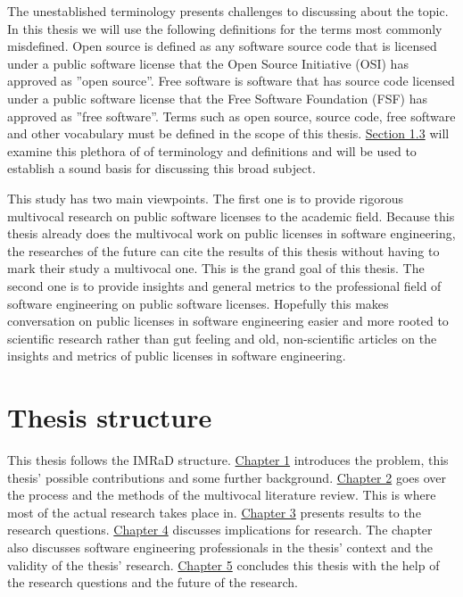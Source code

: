 The unestablished terminology presents challenges to discussing about the topic. In this thesis we will use the following definitions for the terms most commonly misdefined. Open source is defined as any software source code that is licensed under a public software license that the Open Source Initiative (OSI) has approved as ''open source''. Free software is software that has source code licensed under a public software license that the Free Software Foundation (FSF) has approved as ''free software''. 
Terms such as open source, source code, free software and other vocabulary must be defined in the scope of this thesis. \hyperref[sec:bg]{Section 1.3} will examine this plethora of of terminology and definitions and will be used to establish a sound basis for discussing this broad subject.

This study has two main viewpoints. The first one is to provide rigorous multivocal research on public software licenses to the academic field. Because this thesis already does the multivocal work on public licenses in software engineering, the researches of the future can cite the results of this thesis without having to mark their study a multivocal one. This is the grand goal of this thesis. The second one is to provide insights and general metrics to the professional field of software engineering on public software licenses. Hopefully this makes conversation on public licenses in software engineering easier and more rooted to scientific research rather than gut feeling and old, non-scientific articles on the insights and metrics of public licenses in software engineering.

\section{Thesis structure}
This thesis follows the IMRaD structure. \hyperref[intro]{Chapter 1} introduces the problem, this thesis' possible contributions and some further background. \hyperref[methods]{Chapter 2} goes over the process and the methods of the multivocal literature review. This is where most of the actual research takes place in. \hyperref[results]{Chapter 3} presents results to the research questions. \hyperref[discussion]{Chapter 4} discusses implications for research. The chapter also discusses software engineering professionals in the thesis' context and the validity of the thesis' research. \hyperref[conclusions]{Chapter 5} concludes this thesis with the help of the research questions and the future of the research.

